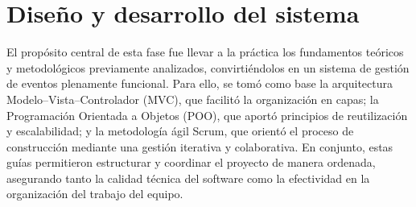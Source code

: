\section{Diseño y desarrollo del sistema}

El propósito central de esta fase fue llevar a la práctica los fundamentos teóricos y metodológicos previamente analizados, convirtiéndolos en un sistema de gestión de eventos plenamente funcional. Para ello, se tomó como base la arquitectura Modelo–Vista–Controlador (MVC), que facilitó la organización en capas; la Programación Orientada a Objetos (POO), que aportó principios de reutilización y escalabilidad; y la metodología ágil Scrum, que orientó el proceso de construcción mediante una gestión iterativa y colaborativa. En conjunto, estas guías permitieron estructurar y coordinar el proyecto de manera ordenada, asegurando tanto la calidad técnica del software como la efectividad en la organización del trabajo del equipo.